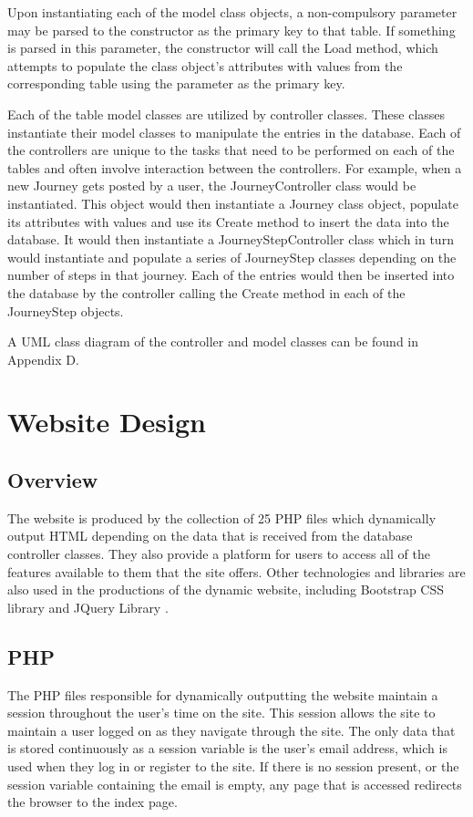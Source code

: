 		Upon instantiating each of the model class objects, a non-compulsory parameter may be parsed to the constructor as the primary key to that table. If something is parsed in this parameter, the constructor will call the Load method, which attempts to populate the class object's attributes with values from the corresponding table using the parameter as the primary key.
		
		Each of the table model classes are utilized by controller classes. These classes instantiate their model classes to manipulate the entries in the database. Each of the controllers are unique to the tasks that need to be performed on each of the tables and often involve interaction between the controllers. For example, when a new Journey gets posted by a user, the Journey\textunderscore Controller class would be instantiated. This object would then instantiate a Journey class object, populate its attributes with values and use its Create method to insert the data into the database. It would then instantiate a Journey\textunderscore Step\textunderscore Controller class which in turn would instantiate and populate a series of Journey\textunderscore Step classes depending on the number of steps in that journey. Each of the entries would then be inserted into the database by the controller calling the Create method in each of the Journey\textunderscore Step objects. 	
				
		A UML class diagram of the controller and model classes can be found in Appendix D. 
		
\section{Website Design}
	\subsection{Overview}
		The website is produced by the collection of 25 PHP files which dynamically output HTML depending on the data that is received from the database controller classes. They also provide a platform for users to access all of the features available to them that the site offers. Other technologies and libraries are also used in the productions of the dynamic website, including Bootstrap CSS library \cite{bootstrap_css} and JQuery Library \cite{jquery_library}.
		
	\subsection{PHP}
		The PHP files responsible for dynamically outputting the website maintain a session throughout the user's time on the site. This session allows the site to maintain a user logged on as they navigate through the site. The only data that is stored continuously as a session variable is the user's email address, which is used when they log in or register to the site. If there is no session present, or the session variable containing the email is empty, any page that is accessed redirects the browser to the index page.
		

